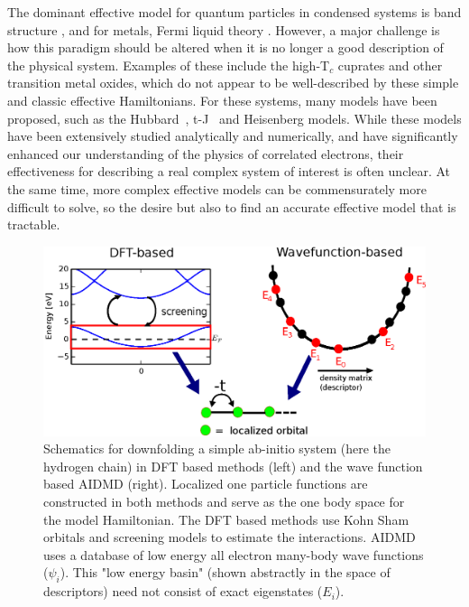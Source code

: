 The dominant effective model for quantum particles in condensed systems is band structure , and for metals, Fermi liquid theory . 
However, a major challenge is how this paradigm should be altered when it is no longer a good description of the physical system.
Examples of these include the high-T$_c$ cuprates and other transition metal oxides, which do not appear to be well-described by these simple and classic effective Hamiltonians. 
For these systems, many models have been proposed, such as the Hubbard~\cite{Hubbard}, t-J~\cite{tJSpalek} and Heisenberg models.
While these models have been extensively studied analytically and numerically, and have significantly enhanced our understanding of the physics of correlated electrons, their effectiveness for describing a real complex system of interest is often unclear. 
At the same time, more complex effective models can be commensurately more difficult to solve, so the desire but also to find an accurate effective model that is tractable. 



\begin{figure}
\centering
\includegraphics[width=1\linewidth]{./Figures/figure1.eps}
\caption{Schematics for downfolding a simple ab-initio system (here the hydrogen chain) in DFT based methods (left) and the wave function based AIDMD (right). 
Localized one particle functions are constructed in both methods and serve as the one body space for the model Hamiltonian. 
The DFT based methods use Kohn Sham orbitals and screening models to estimate the interactions. 
AIDMD uses a database of low energy all electron many-body wave functions ($\psi_i$). 
This "low energy basin" (shown abstractly in the space of descriptors) need not consist of exact eigenstates ($E_i$).}
\label{fig:lowenergybasin_schematic}
\end{figure}	


